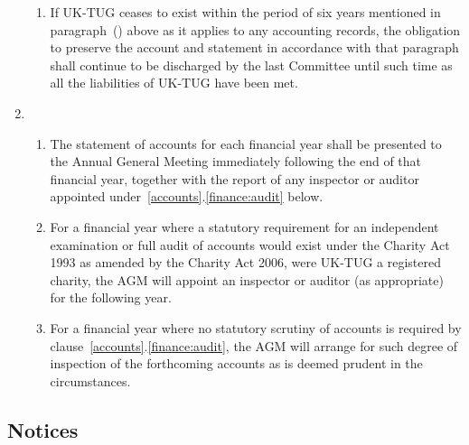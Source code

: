 \documentclass[a4paper,11pt]{article}
\newcounter{refb}
\begin{document}
\begin{enumerate}
\begin{enumerate}
  \item If UK-TUG ceases to exist within the period of six years mentioned in
    paragraph~() above as it applies to any accounting records, the
    obligation to preserve the account and statement in accordance with that
    paragraph shall continue to be discharged by the last Committee until such
    time as all the liabilities of UK-TUG have been met.
  \end{enumerate}

  \item 
    \begin{enumerate}
      \item The statement of accounts for each financial year
        shall be presented to the Annual General Meeting
        immediately following the end of that financial year,
        together with the report of any inspector or auditor
        appointed under~\ref{accounts}.\ref{finance:audit} below.

      \item \label{finance:audit}
        For a financial year where a statutory requirement for an
        independent examination or full audit of accounts would
        exist under the Charity Act 1993 as amended by the
        Charity Act 2006, were UK-TUG a registered charity, the
        AGM will appoint an inspector or auditor (as
        appropriate) for the following year.

      \item For a financial year where no statutory scrutiny of
        accounts is required by
        clause~\ref{accounts}.\ref{finance:audit}, the AGM will
        arrange for such degree of inspection of the forthcoming
        accounts as is deemed prudent in the circumstances.
    \end{enumerate}
\end{enumerate}

\subsection{Notices}
\end{document}
